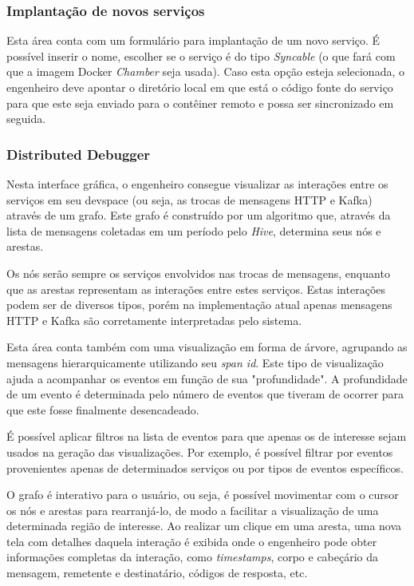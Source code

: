         \subsubsection{Implantação de novos serviços}
    
        Esta área conta com um formulário para implantação de um novo serviço. É possível inserir o nome, escolher se o serviço é do tipo \textit{Syncable} (o que fará com que a imagem Docker \textit{Chamber} seja usada). Caso esta opção esteja selecionada, o engenheiro deve apontar o diretório local em que está o código fonte do serviço para que este seja enviado para o contêiner remoto e possa ser sincronizado em seguida.
    
        \subsubsection{Distributed Debugger}
        Nesta interface gráfica, o engenheiro consegue visualizar as interações entre os serviços em seu devspace (ou seja, as trocas de mensagens HTTP e Kafka) através de um grafo. Este grafo é construído por um algoritmo que, através da lista de mensagens coletadas em um período pelo \textit{Hive}, determina seus nós e arestas.
                
        Os nós serão sempre os serviços envolvidos nas trocas de mensagens, enquanto que as arestas representam as interações entre estes serviços. Estas interações podem ser de diversos tipos, porém na implementação atual apenas mensagens HTTP e Kafka são corretamente interpretadas pelo sistema.
                
        Esta área conta também com uma visualização em forma de árvore, agrupando as mensagens hierarquicamente utilizando seu \textit{span id}. Este tipo de visualização ajuda a acompanhar os eventos em função de sua "profundidade". A profundidade de um evento é determinada pelo número de eventos que tiveram de ocorrer para que este fosse finalmente desencadeado.
        
        É possível aplicar filtros na lista de eventos para que apenas os de interesse sejam usados na geração das visualizações. Por exemplo, é possível filtrar por eventos provenientes apenas de determinados serviços ou por tipos de eventos específicos.
                
        O grafo é interativo para o usuário, ou seja, é possível movimentar com o cursor os nós e arestas para rearranjá-lo, de modo a facilitar a visualização de uma determinada região de interesse. Ao realizar um clique em uma aresta, uma nova tela com detalhes daquela interação é exibida onde o engenheiro pode obter informações completas da interação, como \textit{timestamps}, corpo e cabeçário da mensagem, remetente e destinatário, códigos de resposta, etc.
    

